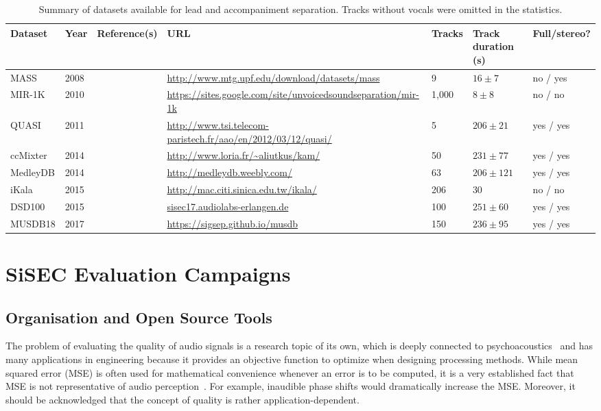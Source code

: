 \begin{table}[htbp]
	\centering
	\caption{Summary of datasets available for lead and accompaniment separation. Tracks without vocals were omitted in the statistics.}
	\label{tab:datasets}
		\begin{tabular}{|l l l l l l l|}
			\hline
			\textbf{Dataset} & \textbf{Year} & \textbf{Reference(s)} & \textbf{URL} & \textbf{Tracks} & \textbf{Track duration (s)} & \textbf{Full/stereo?}\\
			\hline
			MASS & 2008 & \cite{MTGMASSdb} & \url{http://www.mtg.upf.edu/download/datasets/mass} & 9 & $16 \pm 7$ & no / yes \\
			MIR-1K & 2010 & \cite{hsu10} & \url{https://sites.google.com/site/unvoicedsoundseparation/mir-1k} & 1,000 & $8 \pm 8$ & no / no \\
			QUASI & 2011 & \cite{liutkus11,vincent12} & \url{http://www.tsi.telecom-paristech.fr/aao/en/2012/03/12/quasi/} & 5 & $206 \pm 21$ & yes / yes \\
			ccMixter & 2014 & \cite{liutkus142} & \url{http://www.loria.fr/~aliutkus/kam/} & 50 & $231 \pm 77 $ & yes / yes \\
			MedleyDB & 2014 & \cite{bittner14} & \url{http://medleydb.weebly.com/} & 63 & $206 \pm 121$ & yes / yes \\
			iKala & 2015 & \cite{chan15} & \url{http://mac.citi.sinica.edu.tw/ikala/} & 206 & 30 & no / no \\
			DSD100 & 2015 & \cite{ono15} & \url{sisec17.audiolabs-erlangen.de} & 100 & $251 \pm 60$ & yes / yes \\
      MUSDB18 & 2017 & \cite{rafii17} & \url{https://sigsep.github.io/musdb} & 150 & $236 \pm 95$ & yes / yes \\
			\hline
		\end{tabular}
\end{table}


\section{SiSEC Evaluation Campaigns}
\label{sec:evaluation}

\subsection{Organisation and Open Source Tools}
\label{ssec:background}

The problem of evaluating the quality of audio signals is a research topic of its own, which is deeply connected to psychoacoustics~\cite{zwicker13} and has many applications in engineering because it provides an objective function to optimize when designing processing methods. While mean squared error (MSE) is often used for mathematical convenience whenever an error is to be computed, it is a very established fact that MSE is not representative of audio perception~\cite{rix01,wang09}. For example, inaudible phase shifts would dramatically increase the MSE. Moreover, it should be acknowledged  that the concept of quality is rather application-dependent.

